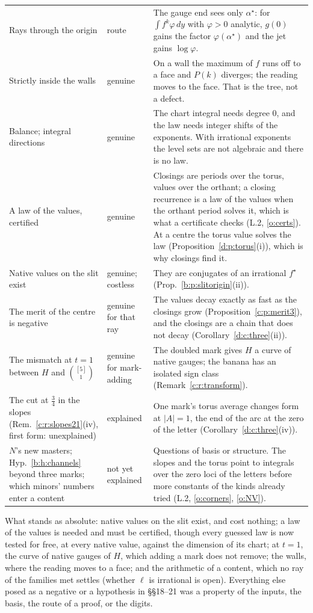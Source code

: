 \documentclass[11pt]{article}
\theoremstyle{plain}
\theoremstyle{definition}
\theoremstyle{remark}
\begin{document}
{\begin{longtable}{@{}>{\raggedright}p{4.5cm} >{\raggedright}p{2.3cm} >{\raggedright\arraybackslash}p{8.2cm}@{}}
Rays through the origin & route & The gauge end sees only $\alpha^\star$: for $\int f^k\varphi\,dy$ with $\varphi>0$ analytic, $g(0)$ gains the factor $\varphi(\alpha^\star)$ and the jet gains $\log\varphi$.\\
Strictly inside the walls & genuine & On a wall the maximum of $f$ runs off to a face and $P(k)$ diverges; the reading moves to the face. That is the tree, not a defect.\\
Balance; integral directions & genuine & The chart integral needs degree $0$, and the law needs integer shifts of the exponents. With irrational exponents the level sets are not algebraic and there is no law.\\
A law of the values, certified & genuine & Closings are periods over the torus, values over the orthant; a closing recurrence is a law of the values when the orthant period solves it, which is what a certificate checks (L.2, \ref{o:certs}). At a centre the torus value solves the law (Proposition~\ref{d:p:torus}(i)), which is why closings find it.\\
Native values on the slit exist & genuine; costless & They are conjugates of an irrational $f^\star$ (Prop.~\ref{b:p:slitorigin}(ii)).\\
The merit of the centre is negative & genuine for that ray & The values decay exactly as fast as the closings grow (Proposition~\ref{c:p:merit3}), and the closings are a chain that does not decay (Corollary~\ref{d:c:three}(ii)).\\
The mismatch at $t=1$ between $H$ and $\binom{[5]}1$ & genuine for mark-adding & The doubled mark gives $H$ a curve of native gauges; the banana has an isolated sign class (Remark~\ref{c:r:transform}).\\
The cut at $\frac34$ in the slopes (Rem.~\ref{c:r:slopes21}(iv), first form: unexplained) & explained & One mark's torus average changes form at $|A|=1$, the end of the arc at the zero of the letter (Corollary~\ref{d:c:three}(iv)).\\
$N$'s new masters; Hyp.~\ref{b:h:channels} beyond three marks; which minors' numbers enter a content & not yet explained & Questions of basis or structure. The slopes and the torus point to integrals over the zero loci of the letters before more constants of the kinds already tried (L.2, \ref{o:corners}, \ref{o:NV}).\\
\bottomrule
\end{longtable}}

\noindent What stands as absolute: native values on the slit exist, and cost nothing; a law of the values is needed and must be certified, though every guessed law is now tested for free, at every native value, against the dimension of its chart; at $t=1$, the curve of native gauges of $H$, which adding a mark does not remove; the walls, where the reading moves to a face; and the arithmetic of a content, which no ray of the families met settles (whether $\ell$ is irrational is open). Everything else posed as a negative or a hypothesis in \S\S18--21 was a property of the inputs, the basis, the route of a proof, or the digits.
\end{document}
